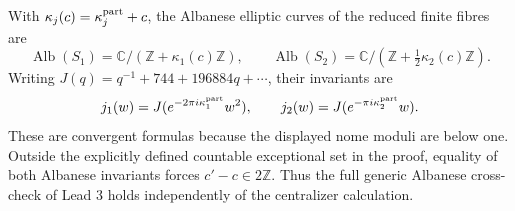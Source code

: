 \begin{proposition}[A.4.1; Proved]\label{st:A.4.1}
With $\kappa_j(c)=\kappa_j^{\rm part}+c$, the Albanese elliptic curves of the reduced finite fibres are
\[
 \operatorname{Alb}(S_1)=\mathbb C/(\mathbb Z+\kappa_1(c)\mathbb Z),\qquad
 \operatorname{Alb}(S_2)=\mathbb C/(\mathbb Z+\tfrac12\kappa_2(c)\mathbb Z).
\]
Writing $J(q)=q^{-1}+744+196884q+\cdots$, their invariants are
\[
 j_1(w)=J(e^{-2\pi i\kappa_1^{\rm part}}w^2),\qquad
 j_2(w)=J(e^{-\pi i\kappa_2^{\rm part}}w).
\]
These are convergent formulas because the displayed nome moduli are below one. Outside the explicitly defined countable exceptional set in the proof, equality of both Albanese invariants forces $c'-c\in2\mathbb Z$. Thus the full generic Albanese cross-check of Lead 3 holds independently of the centralizer calculation.
\end{proposition}
